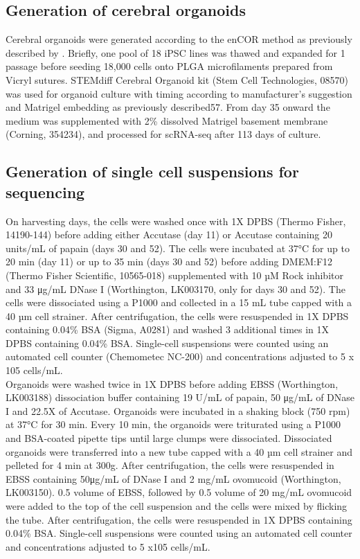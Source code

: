 \subsection{Generation of cerebral organoids}
Cerebral organoids were generated according to the enCOR method as previously described by \cite{lancaster2017guided}. 
Briefly, one pool of 18 iPSC lines was thawed and expanded for 1 passage before seeding 18,000 cells onto PLGA microfilaments prepared from Vicryl sutures. 
STEMdiff Cerebral Organoid kit (Stem Cell Technologies, 08570) was used for organoid culture with timing according to manufacturer's suggestion and Matrigel embedding as previously described57. 
From day 35 onward the medium was supplemented with 2\% dissolved Matrigel basement membrane (Corning, 354234), and processed for scRNA-seq after 113 days of culture. 

\subsection{Generation of single cell suspensions for sequencing}
On harvesting days, the cells were washed once with 1X DPBS (Thermo Fisher, 14190-144) before adding either Accutase (day 11) or Accutase containing 20 units/mL of papain (days 30 and 52). 
The cells were incubated at 37°C for up to 20 min (day 11) or up to 35 min (days 30 and 52) before adding DMEM:F12 (Thermo Fisher Scientific, 10565-018) supplemented with 10 µM Rock inhibitor and 33 μg/mL DNase I (Worthington, LK003170, only for days 30 and 52). 
The cells were dissociated using a P1000 and collected in a 15 mL tube capped with a 40 µm cell strainer. 
After centrifugation, the cells were resuspended in 1X DPBS containing 0.04\% BSA (Sigma, A0281) and washed 3 additional times in 1X DPBS containing 0.04\% BSA. Single-cell suspensions were counted using an automated cell counter (Chemometec NC-200) and concentrations adjusted to 5 x 105 cells/mL. \\

Organoids were washed twice in 1X DPBS before adding EBSS (Worthington, LK003188)  dissociation buffer containing 19 U/mL of papain, 50 μg/mL of DNase I and 22.5X of Accutase.
Organoids were incubated in a shaking block (750 rpm) at 37°C for 30 min. 
Every 10 min, the organoids were triturated using a P1000 and BSA-coated  pipette tips until large clumps were dissociated. 
Dissociated organoids were transferred into a new tube capped with a 40 µm cell strainer and pelleted for 4 min at 300g. 
After centrifugation, the cells were resuspended in EBSS containing 50μg/mL of DNase I and 2 mg/mL ovomucoid (Worthington, LK003150). 
0.5 volume of EBSS, followed by 0.5 volume of 20 mg/mL ovomucoid were added to the top of the cell suspension and the cells were mixed by flicking the tube. 
After centrifugation, the cells were resuspended in 1X DPBS containing 0.04\% BSA. 
Single-cell suspensions were counted using an automated cell counter and concentrations adjusted to 5 x105 cells/mL. 

